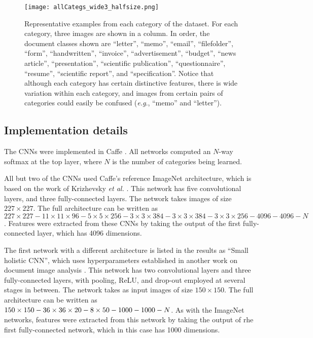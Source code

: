 \documentclass[conference]{IEEEtran_suppress}
\def\eg{\emph{e.g}.} \def\Eg{\emph{E.g}.}
\begin{document}
\begin{figure*}[t]
\begin{center}
\texttt{[image: allCategs\_wide3\_halfsize.png]}
\end{center}
   \caption{Representative examples from each category of the dataset. For each category, three images are shown in a column. In order, the document classes shown are ``letter'', ``memo'', ``email'', ``filefolder'', ``form'', ``handwritten'', ``invoice'', ``advertisement'', ``budget'', ``news article'', ``presentation'', ``scientific publication'', ``questionnaire'', ``resume'', ``scientific report'', and ``specification''. Notice that although each category has certain distinctive features, there is wide variation within each category, and images from certain pairs of categories could easily be confused (\eg, ``memo'' and ``letter'').}
\label{fig:dataset}
\end{figure*}

\subsection{Implementation details}

The CNNs were implemented in Caffe \cite{Jia13caffe}. All networks computed an $N$-way softmax at the top layer, where $N$ is the number of categories being learned. 

All but two of the CNNs used Caffe's reference ImageNet architecture, which is based on the work of Krizhevsky {\em et al.} \cite{kriz}. This network has five convolutional layers, and three fully-connected layers. The network takes images of size $227\times227$. The full architecture can be written as $227\times227 - 11\times11\times96 - 5\times5\times256 - 3\times3\times384 - 3\times3\times384 - 3\times3\times256 - 4096 - 4096 - N$. Features were extracted from these CNNs by taking the output of the first fully-connected layer, which has 4096 dimensions.

The first network with a different architecture is listed in the results as ``Small holistic CNN'', which uses hyperparameters established in another work on document image analysis \cite{lekang}. This network has two convolutional layers and three fully-connected layers, with pooling, ReLU, and drop-out employed at several stages in between. The network takes as input images of size $150\times150$. The full architecture can be written as $150\times150-36\times36\times20-8\time8\times50-1000-1000-N$. As with the ImageNet networks, features were extracted from this network by taking the output of rhe first fully-connected network, which in this case has 1000 dimensions. 
\end{document}
